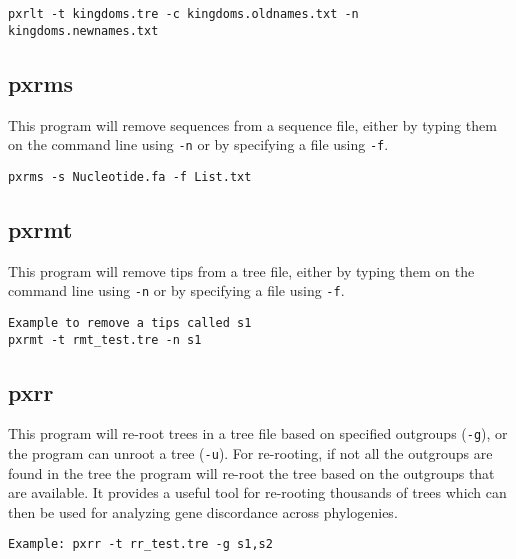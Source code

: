 \documentclass[12pt,letterpaper]{memoir}
\begin{document}
\begin{flushleft}
\begin{verbatim}
pxrlt -t kingdoms.tre -c kingdoms.oldnames.txt -n kingdoms.newnames.txt
\end{verbatim}
\end{flushleft}

\subsection{pxrms}

This program will remove sequences from a sequence file, either by typing them on the command line using \texttt{-n} or by specifying a file using \texttt{-f}.

\begin{flushleft}
\begin{verbatim}
pxrms -s Nucleotide.fa -f List.txt
\end{verbatim}
\end{flushleft}

\subsection{pxrmt}

This program will remove tips from a tree file, either by typing them on the command line using \texttt{-n} or by specifying a file using \texttt{-f}.

\begin{flushleft}
\begin{verbatim}
Example to remove a tips called s1
pxrmt -t rmt_test.tre -n s1
\end{verbatim}
\end{flushleft}

\subsection{pxrr}

This program will re-root trees in a tree file based on specified outgroups (\texttt{-g}), or the program can unroot a tree (\texttt{-u}). For re-rooting, if not all the outgroups are found in the tree the program will re-root the tree based on the outgroups that are available. It provides a useful tool for re-rooting thousands of trees which can then be used for analyzing gene discordance across phylogenies.

\begin{flushleft}
\begin{verbatim}
Example: pxrr -t rr_test.tre -g s1,s2
\end{verbatim}
\end{flushleft}
\end{document}
